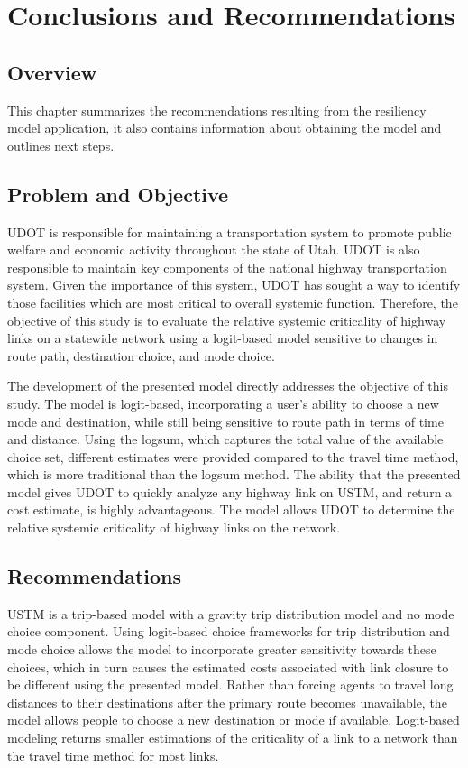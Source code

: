 \chapter{Conclusions and Recommendations}
\label{chp:chapter5}
\graphicspath{{figures/}{figures/chapter5/}}

\section{Overview}

This chapter summarizes the recommendations resulting from the resiliency
model application, it also contains information about obtaining the model and
outlines next steps.

\section{Problem and Objective}

UDOT is responsible for maintaining a
transportation system to promote public welfare and economic activity throughout
the state of Utah. UDOT is also responsible to maintain key components of the
national highway transportation system. Given the importance of this system,
UDOT has sought a way to identify those facilities which are most critical to
overall systemic function. Therefore, the objective of this study is to evaluate the relative systemic
criticality of highway links on a statewide network using a logit-based model
sensitive to changes in route path, destination choice, and mode choice.

The development of the presented model directly addresses the objective of
this study. The model is logit-based, incorporating a user's
ability to choose a new mode and destination, while still being sensitive to route
path in terms of time and distance. Using the logsum, which captures the total
value of the available choice set, different estimates were provided compared to
the travel time method, which is more traditional than the logsum method. The ability that the
presented model gives UDOT to quickly analyze any highway link on USTM, and return a
cost estimate, is highly advantageous. The model allows UDOT to determine
the relative systemic criticality of highway links on the network.

\section{Recommendations}

USTM is a trip-based model with a gravity trip distribution model and no mode
choice component. Using logit-based choice frameworks for trip distribution
and mode choice allows the model to incorporate greater sensitivity towards these
choices, which in turn causes
the estimated costs associated with link closure to be different using the presented model.
Rather than forcing agents to travel long distances to their destinations after the
primary route becomes unavailable, the model
allows people to choose a new destination or mode if available.
Logit-based modeling returns smaller
estimations of the criticality of a link to a network than the travel time method
for most links.

